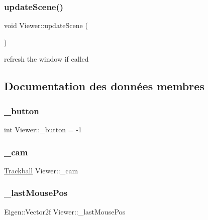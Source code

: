 \subsubsection{\texorpdfstring{update\+Scene()}{updateScene()}}
{\footnotesize\ttfamily void Viewer\+::update\+Scene (\begin{DoxyParamCaption}{ }\end{DoxyParamCaption})}



refresh the window if called 



\subsection{Documentation des données membres}
\mbox{\label{class_viewer_aebac1d4a942eab5c1bfcfe46c67f7c6a}} 
\subsubsection{\texorpdfstring{\+\_\+button}{\_button}}
{\footnotesize\ttfamily int Viewer\+::\+\_\+button = -\/1\hspace{0.3cm}{\ttfamily [private]}}

\mbox{\label{class_viewer_ae5cf141efe1b370bddb3aee4f459aae6}} 
\subsubsection{\texorpdfstring{\+\_\+cam}{\_cam}}
{\footnotesize\ttfamily \hyperlink{class_trackball}{Trackball} Viewer\+::\+\_\+cam\hspace{0.3cm}{\ttfamily [private]}}

\mbox{\label{class_viewer_a809a18b8663d86d127fee482326919ad}} 
\subsubsection{\texorpdfstring{\+\_\+last\+Mouse\+Pos}{\_lastMousePos}}
{\footnotesize\ttfamily Eigen\+::\+Vector2f Viewer\+::\+\_\+last\+Mouse\+Pos\hspace{0.3cm}{\ttfamily [private]}}

